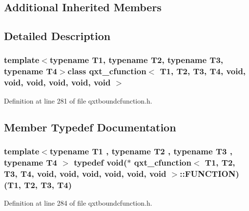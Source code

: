 \subsection*{Additional Inherited Members}


\subsection{Detailed Description}
\subsubsection*{template$<$typename T1, typename T2, typename T3, typename T4$>$class qxt\-\_\-cfunction$<$ T1, T2, T3, T4, void, void, void, void, void, void $>$}



Definition at line 281 of file qxtboundcfunction.\-h.



\subsection{Member Typedef Documentation}
\hypertarget{classqxt__cfunction_3_01_t1_00_01_t2_00_01_t3_00_01_t4_00_01void_00_01void_00_01void_00_01void_00_01void_00_01void_01_4_a81a174b3e027dfc2c4222dabd9725b31}{
\subsubsection[{F\-U\-N\-C\-T\-I\-O\-N}]{\setlength{\rightskip}{0pt plus 5cm}template$<$typename T1 , typename T2 , typename T3 , typename T4 $>$ typedef {\bf void}($\ast$ {\bf qxt\-\_\-cfunction}$<$ T1, T2, T3, T4, {\bf void}, {\bf void}, {\bf void}, {\bf void}, {\bf void}, {\bf void} $>$\-::F\-U\-N\-C\-T\-I\-O\-N)(T1, T2, T3, T4)}}\label{classqxt__cfunction_3_01_t1_00_01_t2_00_01_t3_00_01_t4_00_01void_00_01void_00_01void_00_01void_00_01void_00_01void_01_4_a81a174b3e027dfc2c4222dabd9725b31}


Definition at line 284 of file qxtboundcfunction.\-h.



